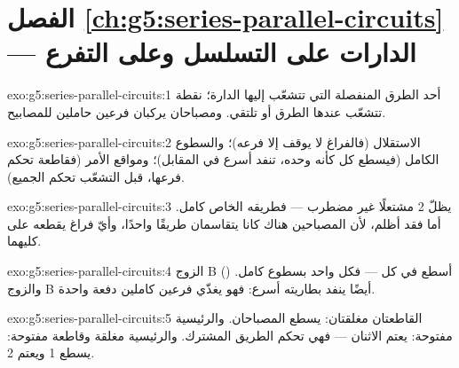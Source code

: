 \section*{الفصل \ref{ch:g5:series-parallel-circuits} --- الدارات على التسلسل وعلى التفرع}

\begin{solution}{exo:g5:series-parallel-circuits:1}
 أحد الطرق المنفصلة التي تتشعّب إليها الدارة؛  نقطة
تتشعّب عندها الطرق أو تلتقي. ومصباحان  يركبان فرعين
حاملين للمصابيح.
\end{solution}

\begin{solution}{exo:g5:series-parallel-circuits:2}
الاستقلال (فالفراغ لا يوقف إلا فرعه)؛ والسطوع الكامل (فيسطع كل
 كأنه وحده،  تنفد أسرع في المقابل)؛ ومواقع الأمر
(فقاطعة  تحكم فرعها،  قبل التشعّب تحكم الجميع).
\end{solution}

\begin{solution}{exo:g5:series-parallel-circuits:3}
يظلّ  2 مشتعلًا غير مضطرب --- فطريقه الخاص كامل. أما  فقد أظلم، لأن المصباحين هناك كانا يتقاسمان طريقًا واحدًا،
وأيّ فراغ يقطعه على كليهما.
\end{solution}

\begin{solution}{exo:g5:series-parallel-circuits:4}
الزوج B () أسطع في كل  --- فكل واحد بسطوع كامل.
والزوج B أيضًا ينفد بطاريته أسرع: فهو يغذّي فرعين كاملين دفعة
واحدة.
\end{solution}

\begin{solution}{exo:g5:series-parallel-circuits:5}
القاطعتان مغلقتان: يسطع المصباحان. والرئيسية مفتوحة: يعتم
الاثنان --- فهي تحكم الطريق المشترك. والرئيسية مغلقة وقاطعة
 مفتوحة: يسطع  1 ويعتم  2.
\end{solution}

